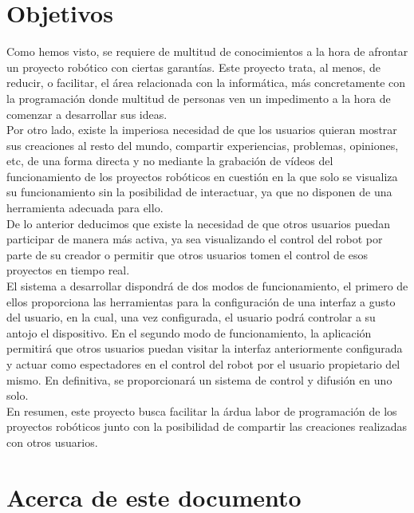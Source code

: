 \documentclass[a4paper,12pt]{article}
\begin{document}
\section{Objetivos}
\label{sec:objetivos}

Como hemos visto, se requiere de multitud de conocimientos a la hora de afrontar un proyecto robótico con ciertas garantías. Este proyecto trata, al menos, de reducir, o facilitar, el área relacionada con
la informática, más concretamente con la programación donde multitud de personas ven un impedimento a la hora de comenzar a desarrollar sus ideas.\\

Por otro lado, existe la imperiosa necesidad de que los usuarios quieran mostrar sus creaciones al resto del mundo, compartir experiencias, problemas, opiniones, etc, de una forma directa y no
mediante la grabación de vídeos del funcionamiento de los proyectos robóticos en cuestión en la que solo se visualiza su funcionamiento sin la posibilidad de interactuar, ya que no disponen de una herramienta adecuada para ello.\\

De lo anterior deducimos que existe la necesidad de que otros usuarios puedan participar de manera más activa, ya sea visualizando el control del robot por parte de su creador o permitir que otros usuarios
tomen el control de esos proyectos en tiempo real.\\

El sistema a desarrollar dispondrá de dos modos de funcionamiento, el primero de ellos proporciona las herramientas para la configuración de una interfaz a gusto del usuario, en la cual, 
una vez configurada, el usuario podrá controlar a su antojo el dispositivo. En el segundo modo de funcionamiento, la aplicación permitirá que otros usuarios puedan visitar la interfaz anteriormente 
configurada y actuar como espectadores en el control del robot por el usuario propietario del mismo. En definitiva, se proporcionará un sistema de control y difusión en uno solo.\\


En resumen, este proyecto busca facilitar la árdua labor de programación de los proyectos robóticos junto con la posibilidad de compartir las creaciones realizadas con otros usuarios.\\


\section{Acerca de este documento}
\end{document}
